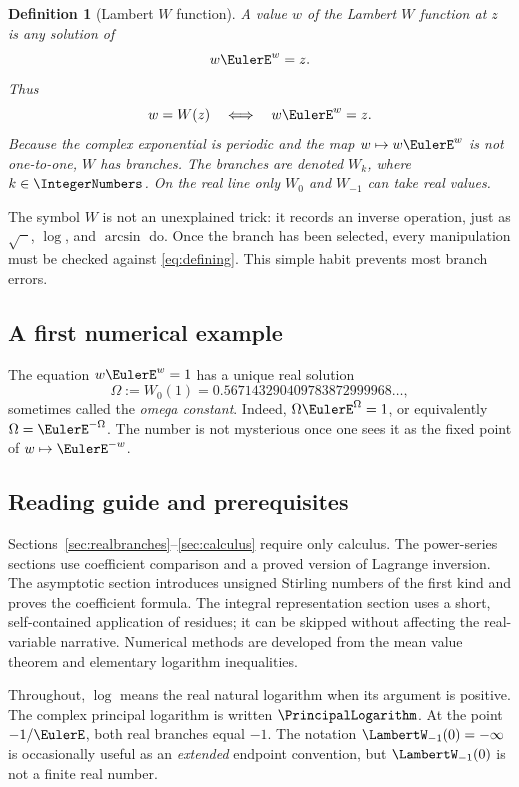\documentclass[11pt]{article}
\newtheorem{definition}[definition]{Definition}
\theoremstyle{remark}
\newcommand{\Wm}{\LambertW_{-1}}
\begin{document}
\begin{definition}[Lambert \(W\) function]
A value \(w\) of the Lambert \(W\) function at \(z\) is any solution of
\begin{equation}\label{eq:defining}
       w\EulerE^w=z.
\end{equation}
Thus
\[
       w=W(z)\quad\Longleftrightarrow\quad w\EulerE^w=z.
\]
Because the complex exponential is periodic and the map \(w\mapsto w\EulerE^w\)
is not one-to-one, \(W\) has branches.  The branches are denoted \(W_k\),
where \(k\in\IntegerNumbers\).  On the real line only \(W_0\) and \(W_{-1}\) can
take real values.
\end{definition}

The symbol \(W\) is not an unexplained trick: it records an inverse operation,
just as \(\sqrt{\phantom{x}}\), \(\log\), and \(\arcsin\) do.  Once the branch
has been selected, every manipulation must be checked against
\eqref{eq:defining}.  This simple habit prevents most branch errors.

\subsection{A first numerical example}

The equation \(w\EulerE^w=1\) has a unique real solution
\[
      \Omega:=W_0(1)=0.567143290409783872999968\ldots,
\]
sometimes called the \emph{omega constant}.  Indeed,
\(\Omega\EulerE^\Omega=1\), or equivalently \(\Omega=\EulerE^{-\Omega}\).
The number is not mysterious once one sees it as the fixed point of
\(w\mapsto \EulerE^{-w}\).

\subsection{Reading guide and prerequisites}

Sections~\ref{sec:realbranches}--\ref{sec:calculus} require only calculus.
The power-series sections use coefficient comparison and a proved version of
Lagrange inversion.  The asymptotic section introduces unsigned Stirling
numbers of the first kind and proves the coefficient formula.  The integral
representation section uses a short, self-contained application of residues;
it can be skipped without affecting the real-variable narrative.  Numerical
methods are developed from the mean value theorem and elementary logarithm
inequalities.

Throughout, \(\log\) means the real natural logarithm when its argument is
positive.  The complex principal logarithm is written \(\PrincipalLogarithm\).  At the point
\(-1/\EulerE\), both real branches equal \(-1\).  The notation
\(\Wm(0)=-\infty\) is occasionally useful as an \emph{extended} endpoint
convention, but \(\Wm(0)\) is not a finite real number.
\end{document}

